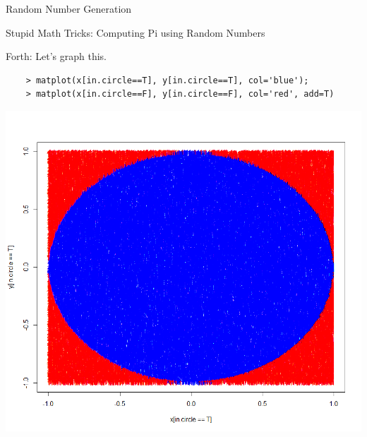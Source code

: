 \documentclass{beamer}
\begin{document}
\begin{frame}{Random Number Generation}

    Stupid Math Tricks: Computing Pi using Random Numbers

    Forth: Let's graph this.

    \begin{verbatim}
    > matplot(x[in.circle==T], y[in.circle==T], col='blue');
    > matplot(x[in.circle==F], y[in.circle==F], col='red', add=T)
    \end{verbatim}

    \includegraphics{dartboard.png}

\end{frame}
\end{document}
